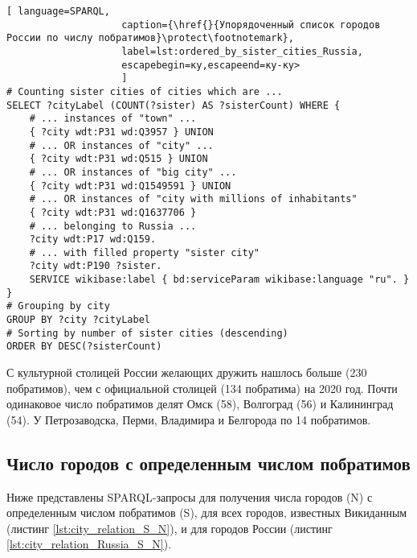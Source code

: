 \begin{lstlisting}[ language=SPARQL, 
                    caption={\href{}{Упорядоченный список городов России по числу побратимов}\protect\footnotemark},
                    label=lst:ordered_by_sister_cities_Russia, 
                    escapebegin=ку,escapeend=ку-ку>
                    ]
# Counting sister cities of cities which are ...
SELECT ?cityLabel (COUNT(?sister) AS ?sisterCount) WHERE {           
	# ... instances of "town" ...
	{ ?city wdt:P31 wd:Q3957 } UNION 
	# ... OR instances of "city" ...                                  
	{ ?city wdt:P31 wd:Q515 } UNION   
	# ... OR instances of "big city" ...                                 
	{ ?city wdt:P31 wd:Q1549591 } UNION   
	# ... OR instances of "city with millions of inhabitants"                             
	{ ?city wdt:P31 wd:Q1637706 }     
	# ... belonging to Russia ...                                 
	?city wdt:P17 wd:Q159.   
	# ... with filled property "sister city"                                          
	?city wdt:P190 ?sister.                                            
	SERVICE wikibase:label { bd:serviceParam wikibase:language "ru". }
}
# Grouping by city
GROUP BY ?city ?cityLabel  
# Sorting by number of sister cities (descending)                                          
ORDER BY DESC(?sisterCount)                                          
\end{lstlisting}

С культурной столицей России желающих дружить нашлось больше (230 побратимов), чем с официальной столицей (134 побратима) на 2020 год. Почти одинаковое число побратимов делят Омск (58), Волгоград (56) и Калининград (54). У Петрозаводска, Перми, Владимира и Белгорода по 14 побратимов.

\subsection{Число городов с определенным числом побратимов}

Ниже представлены SPARQL-запросы для получения числа городов (N) с определенным числом побратимов (S), для всех городов, известных Викиданным (листинг \ref{lst:city_relation_S_N}), и для городов России (листинг \ref{lst:city_relation_Russia_S_N}).

